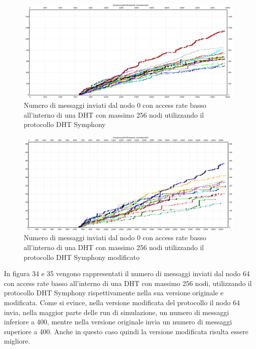 \documentclass[	
	DIV=calc,
	paper=a4,
	fontsize=11pt,
	onecolumn
]{scrartcl} %
\begin{document}
	\begin{figure}[H]
		\centering
		\includegraphics[scale=0.35]	{SymphonyDHT/plots/MessagesSentByEveryNode/256_Nodes_SlowAccess/SymphonyDHT_256Nodes_SlowAccess_Node0.png}
		\caption{Numero di messaggi inviati dal nodo 0 con access rate basso all'interno di una DHT con massimo 256 nodi utilizzando il protocollo DHT Symphony}
		\label{Figura 32}
	\end{figure}
	\begin{figure}[H]
		\centering
		\includegraphics[scale=0.35]	{SymphonyDHTMod/plots/MessagesSentByEveryNode/256_Nodes_SlowAccess/SymphonyDHTMod_256Nodes_SlowAccess_Node0.png}
		\caption{Numero di messaggi inviati dal nodo 0 con access rate basso all'interno di una DHT con massimo 256 nodi utilizzando il protocollo DHT Symphony modificato}
		\label{Figura 33}
	\end{figure}	
	
	In figura 34 e 35 vengono rappresentati il numero di messaggi inviati dal nodo 64 con access rate basso all'interno di una DHT con massimo 256 nodi, utilizzando il protocollo DHT Symphony rispettivamente nella sua versione originale e modificata. Come si evince, nella versione modificata del protocollo il nodo 64 invia, nella maggior parte delle run di simulazione, un numero di messaggi inferiore a 400, mentre nella versione originale invia un numero di messaggi superiore a 400. Anche in questo caso quindi la versione modificata risulta essere migliore.
	
\end{document}
